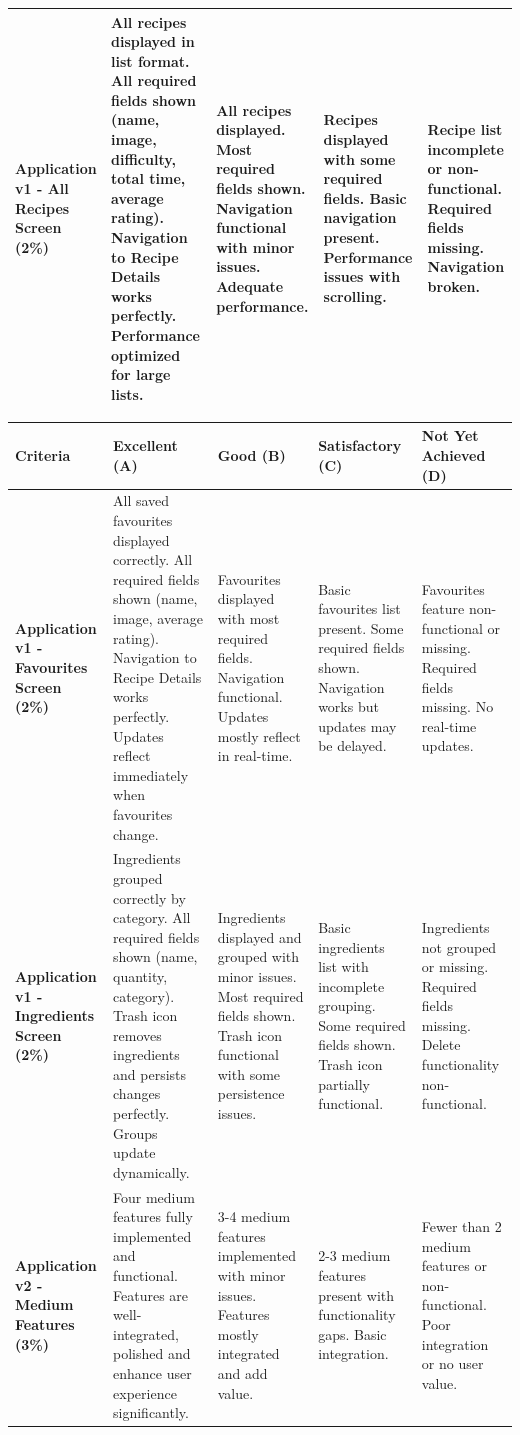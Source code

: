 \documentclass{article}
\begin{document}
\begin{landscape}
\begin{tabular}{|p{5cm}|p{4cm}|p{4cm}|p{4cm}|p{4cm}|}
\textbf{Application v1 - All Recipes Screen (2\%)} & 
All recipes displayed in list format. All required fields shown (name, image, difficulty, total time, average rating). Navigation to Recipe Details works perfectly. Performance optimized for large lists. & 
All recipes displayed. Most required fields shown. Navigation functional with minor issues. Adequate performance. & 
Recipes displayed with some required fields. Basic navigation present. Performance issues with scrolling. & 
Recipe list incomplete or non-functional. Required fields missing. Navigation broken. \\ \hline

\end{tabular}

\begin{tabular}{|p{5cm}|p{4cm}|p{4cm}|p{4cm}|p{4cm}|}
\hline
\textbf{Criteria} & \textbf{Excellent (A)} & \textbf{Good (B)} & \textbf{Satisfactory (C)} & \textbf{Not Yet Achieved (D)} \\ \hline

\textbf{Application v1 - Favourites Screen (2\%)} & 
All saved favourites displayed correctly. All required fields shown (name, image, average rating). Navigation to Recipe Details works perfectly. Updates reflect immediately when favourites change. & 
Favourites displayed with most required fields. Navigation functional. Updates mostly reflect in real-time. & 
Basic favourites list present. Some required fields shown. Navigation works but updates may be delayed. & 
Favourites feature non-functional or missing. Required fields missing. No real-time updates. \\ \hline

\textbf{Application v1 - Ingredients Screen (2\%)} & 
Ingredients grouped correctly by category. All required fields shown (name, quantity, category). Trash icon removes ingredients and persists changes perfectly. Groups update dynamically. & 
Ingredients displayed and grouped with minor issues. Most required fields shown. Trash icon functional with some persistence issues. & 
Basic ingredients list with incomplete grouping. Some required fields shown. Trash icon partially functional. & 
Ingredients not grouped or missing. Required fields missing. Delete functionality non-functional. \\ \hline

\textbf{Application v2 - Medium Features (3\%)} & 
Four medium features fully implemented and functional. Features are well-integrated, polished and enhance user experience significantly. & 
3-4 medium features implemented with minor issues. Features mostly integrated and add value. & 
2-3 medium features present with functionality gaps. Basic integration. & 
Fewer than 2 medium features or non-functional. Poor integration or no user value. \\ \hline


\end{tabular}
\end{landscape}
\end{document}
